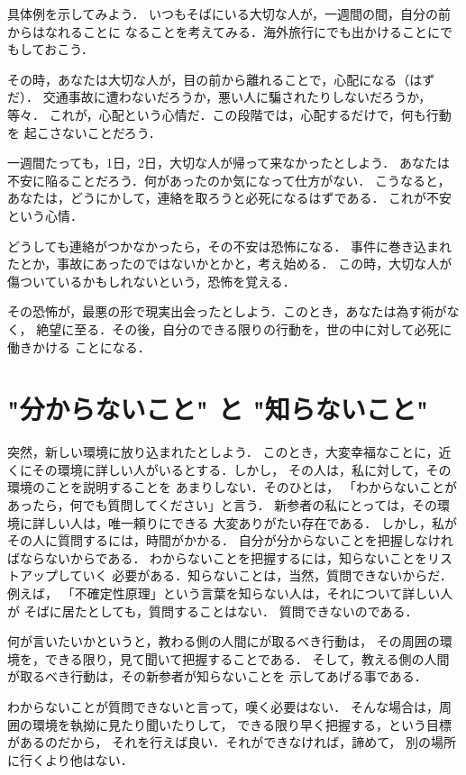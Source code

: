             具体例を示してみよう．
            いつもそばにいる大切な人が，一週間の間，自分の前からはなれることに
            なることを考えてみる．海外旅行にでも出かけることにでもしておこう．
            
            その時，あなたは大切な人が，目の前から離れることで，心配になる（はずだ）．
            交通事故に遭わないだろうか，悪い人に騙されたりしないだろうか，等々．
            これが，心配という心情だ．この段階では，心配するだけで，何も行動を
            起こさないことだろう．

            一週間たっても，1日，2日，大切な人が帰って来なかったとしよう．
            あなたは不安に陥ることだろう．何があったのか気になって仕方がない．
            こうなると，あなたは，どうにかして，連絡を取ろうと必死になるはずである．
            これが不安という心情．

            どうしても連絡がつかなかったら，その不安は恐怖になる．
            事件に巻き込まれたとか，事故にあったのではないかとかと，考え始める．
            この時，大切な人が傷ついているかもしれないという，恐怖を覚える．

            その恐怖が，最悪の形で現実出会ったとしよう．このとき，あなたは為す術がなく，
            絶望に至る．その後，自分のできる限りの行動を，世の中に対して必死に働きかける
            ことになる．



        \section{"分からないこと" と "知らないこと"}
            突然，新しい環境に放り込まれたとしよう．
            このとき，大変幸福なことに，近くにその環境に詳しい人がいるとする．しかし，
            その人は，私に対して，その環境のことを説明することを
            あまりしない．そのひとは，
            「わからないことがあったら，何でも質問してください」と言う．
            新参者の私にとっては，その環境に詳しい人は，唯一頼りにできる
            大変ありがたい存在である．
            しかし，私がその人に質問するには，時間がかかる．
            自分が分からないことを把握しなければならないからである．
            わからないことを把握するには，知らないことをリストアップしていく
            必要がある．知らないことは，当然，質問できないからだ．例えば，
            「不確定性原理」という言葉を知らない人は，それについて詳しい人が
            そばに居たとしても，質問することはない．
            質問できないのである．

            何が言いたいかというと，教わる側の人間にが取るべき行動は，
            その周囲の環境を，できる限り，見て聞いて把握することである．
            そして，教える側の人間が取るべき行動は，その新参者が知らないことを
            示してあげる事である．

            わからないことが質問できないと言って，嘆く必要はない．
            そんな場合は，周囲の環境を執拗に見たり聞いたりして，
            できる限り早く把握する，という目標があるのだから，
            それを行えば良い．それができなければ，諦めて，
            別の場所に行くより他はない．
